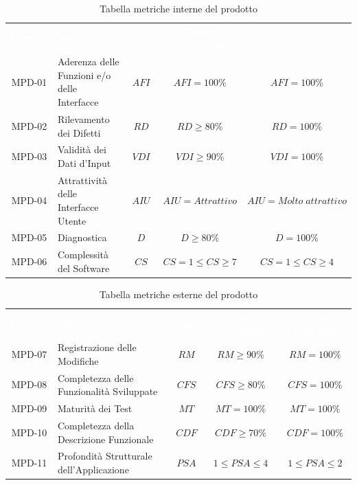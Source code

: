     \renewcommand{\arraystretch}{1.5}
    \begin{longtable}{ c C{4cm} c c c}
    \caption{Tabella metriche interne del prodotto}\\
    \textcolor{white}{\textbf{Metrica}} & \textcolor{white}{\textbf{Nome}} & \textcolor{white}{\textbf{Sigla}} & \textcolor{white}{\textbf{Valore Accettabile}} & \textcolor{white}{\textbf{Valore Ottimale}}\\
    MPD-01 & Aderenza delle Funzioni e/o delle Interfacce & $AFI$ & $AFI = 100\%$ & $AFI = 100\%$ \\
    MPD-02 & Rilevamento dei Difetti & $RD$ & $ RD \geq 80\% $ & $RD = 100\%$ \\
    MPD-03 & Validità dei Dati d'Input & $VDI$ &  $VDI \geq 90\%$ &  $VDI = 100\%$ \\
    MPD-04 & Attrattività delle Interfacce Utente & $AIU$ & $AIU = Attrattivo$ &  $AIU = Molto \; attrattivo$ \\
    MPD-05 & Diagnostica & $D$ & $D \geq 80\% $ & $D = 100\% $ \\
    MPD-06 & Complessità del Software & $CS $ & $CS = 1 \leq CS \geq 7 $ & $CS = 1 \leq CS \geq 4$ \\
    \end{longtable} 

\newpage %

    \renewcommand{\arraystretch}{1.5}
    \begin{longtable}{ c C{4cm} c c c}
    \caption{Tabella metriche esterne del prodotto}\\
    \textcolor{white}{\textbf{Metrica}} & \textcolor{white}{\textbf{Nome}} & \textcolor{white}{\textbf{Sigla}} & \textcolor{white}{\textbf{Valore Accettabile}} & \textcolor{white}{\textbf{Valore Ottimale}}\\
    MPD-07 & Registrazione delle Modifiche & $RM$ & $RM \geq 90\%$ & $RM = 100\%$ \\
    MPD-08 & Completezza delle Funzionalità Sviluppate & $CFS$ & $CFS \geq 80\%$ & $CFS = 100\%$  \\
    MPD-09 & Maturità dei Test & $MT$ & $MT=100\% $ & $MT=100\%$  \\	
    MPD-10 & Completezza della Descrizione Funzionale & $CDF $ & $CDF \geq 70\%$ & $CDF = 100\%$  \\
    MPD-11 &  Profondità Strutturale dell'Applicazione & $PSA$ & $1 \leq PSA \leq 4$ &$1 \leq PSA \leq 2$  \\
    \end{longtable}  
                
       
                 
       
       
